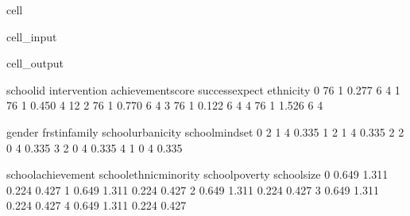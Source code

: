 \documentclass[letterpaper,10pt,english]{jupyterBook}
\begin{document}
\begin{sphinxuseclass}{cell}\begin{sphinxVerbatimInput}

\begin{sphinxuseclass}{cell_input}
\begin{sphinxVerbatim}[commandchars=\\\{\}]
  
\end{sphinxVerbatim}

\end{sphinxuseclass}\end{sphinxVerbatimInput}
\begin{sphinxVerbatimOutput}

\begin{sphinxuseclass}{cell_output}
\begin{sphinxVerbatim}[commandchars=\\\{\}]
   schoolid  intervention  achievement\PYGZus{}score  success\PYGZus{}expect  ethnicity  \PYGZbs{}
0        76             1              0.277               6          4   
1        76             1             \PYGZhy{}0.450               4         12   
2        76             1              0.770               6          4   
3        76             1             \PYGZhy{}0.122               6          4   
4        76             1              1.526               6          4   

   gender  frst\PYGZus{}in\PYGZus{}family  school\PYGZus{}urbanicity  school\PYGZus{}mindset  \PYGZbs{}
0       2               1                  4           0.335   
1       2               1                  4           0.335   
2       2               0                  4           0.335   
3       2               0                  4           0.335   
4       1               0                  4           0.335   

   school\PYGZus{}achievement  school\PYGZus{}ethnic\PYGZus{}minority  school\PYGZus{}poverty  school\PYGZus{}size  
0               0.649                  \PYGZhy{}1.311           0.224       \PYGZhy{}0.427  
1               0.649                  \PYGZhy{}1.311           0.224       \PYGZhy{}0.427  
2               0.649                  \PYGZhy{}1.311           0.224       \PYGZhy{}0.427  
3               0.649                  \PYGZhy{}1.311           0.224       \PYGZhy{}0.427  
4               0.649                  \PYGZhy{}1.311           0.224       \PYGZhy{}0.427  
\end{sphinxVerbatim}

\end{sphinxuseclass}\end{sphinxVerbatimOutput}

\end{sphinxuseclass}
\end{document}
